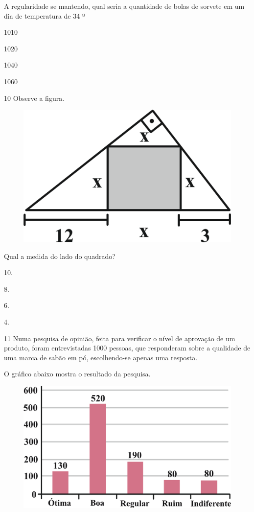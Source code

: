 A regularidade se mantendo, qual seria a quantidade de bolas de sorvete
em um dia de temperatura de 34 º

\begin{escolha}
\item 1010

\item 1020

\item 1040

\item 1060
\end{escolha}


\pagebreak
\num{10} Observe a figura.

\begin{figure}[htpb!]
\centering
\includegraphics[width=.5\textwidth]{./ilustras-mat/Simulado_4-atividade_10_resposta.png}
\end{figure}

Qual a medida do lado do quadrado?

\begin{escolha}
\item 10.

\item 8.

\item 6.

\item 4.
\end{escolha}


\pagebreak
\num{11} Numa pesquisa de opinião, feita para verificar o nível de aprovação
de um produto, foram entrevistadas 1000 pessoas, que responderam sobre a
qualidade de uma marca de sabão em pó, escolhendo-se apenas uma
resposta.

O gráfico abaixo mostra o resultado da pesquisa.

\begin{figure}[htpb!]
\centering
\includegraphics[width=\textwidth]{./ilustras-mat/Simulado_4-atividade_11.png}
\end{figure}

